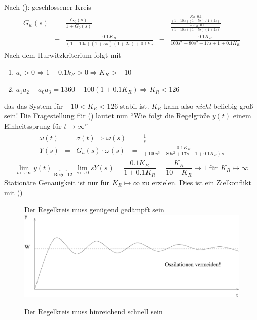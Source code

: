 \documentclass[12pt,a4paper,ngerman]{scrartcl}
\newcommand{\RM}[1]{\MakeUppercase{\romannumeral #1{.}}}
\begin{document}
\begin{itemize}
Nach (\RM{1}): geschlossener Kreis
\begin{align*}
  \begin{array}{llllll}
    G_w(s)&=&\frac{G_0(s)}{1+G_0(s)}&=&\frac{\frac{K_R\cdot 0.1}{(1+10s)(1+5s)(1+2s)}}{\frac{1+K_R\cdot 0.1}{(1+10s)(1+5s)(1+2s)}}\\
    &=&\frac{0.1K_R}{(1+10s)(1+5s)(1+2s)+0.1k_R}&=&\frac{0.1K_R}{100s^2+80s^2+17s+1+0.1K_R}
  \end{array}
\end{align*}
Nach dem Hurwitzkriterium folgt mit
\begin{enumerate}
\item $a_i>0 \Rightarrow 1+0.1k_R>0\Rightarrow K_R> -10$
\item $a_1a_2-a_0a_3=1360-100(1+0.1K_R)\Rightarrow K_R<126$
\end{enumerate}
das das System für $-10<K_R<126$ stabil ist. $K_R$ kann also \emph{nicht} beliebig groß sein! Die Fragestellung für (\RM{2}) lautet nun ``Wie folgt die Regelgröße $y(t)$ einem Einheitssprung für $t\mapsto \infty$''
\begin{align*}
  \begin{array}{lllll}
    \omega (t)&=&\sigma(t)\Rightarrow \omega (s)&=&\frac{1}{s}\\
    Y(s)&=&G_u(s)\cdot\omega (s)&=&\frac{0.1K_R}{(100s^3+80s^2+17s+1+0.1K_R)s}
  \end{array}
\end{align*}
\[
\lim\limits_{t\mapsto\infty}{y(t)}\underbrace{=}_{\text{Regel 12}}\lim\limits_{s\mapsto 0}{sY(s)}=\frac{0.1K_R}{1+0.1K_R}=\frac{K_R}{10+K_R}\mapsto 1\text{ für }K_R\mapsto\infty
\]
Stationäre Genauigkeit ist nur für $K_R\mapsto\infty$ zu erzielen. Dies ist ein Zielkonflikt mit (\RM{1})
  \begin{figure}[H]
\item[\RM{3}] \underline{Der Regelkreis muss genügend gedämpft sein}\\

    \centering
    \includegraphics[width=.7\linewidth]{sysregel_No_3}
  \end{figure}
\begin{figure}[H]
\item[\RM{4}] \underline{Der Regelkreis muss hinreichend schnell sein}\\
  

\end{figure}
\end{itemize}
\end{document}
